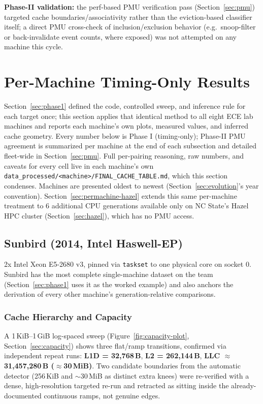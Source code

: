 \documentclass{article}
\begin{document}
\textbf{Phase-II validation:} the perf-based PMU verification pass (Section~\ref{sec:pmu})
targeted cache boundaries/associativity rather than the eviction-based classifier itself;
a direct PMU cross-check of inclusion/exclusion behavior (e.g.\ snoop-filter or
back-invalidate event counts, where exposed) was not attempted on any machine this cycle.

\section{Per-Machine Timing-Only Results}
\label{sec:permachine}

Section~\ref{sec:phase1} defined the code, controlled sweep, and inference rule for each
target once; this section applies that identical method to all eight ECE lab machines and
reports each machine's own plots, measured values, and inferred cache geometry. Every
number below is Phase I (timing-only); Phase-II PMU agreement is summarized per machine at
the end of each subsection and detailed fleet-wide in Section~\ref{sec:pmu}. Full
per-pairing reasoning, raw numbers, and caveats for every cell live in each machine's own
\texttt{data\_processed/<machine>/FINAL\_CACHE\_TABLE.md}, which this section condenses.
Machines are presented oldest to newest (Section~\ref{sec:evolution}'s year convention).
Section~\ref{sec:permachine-hazel} extends this same per-machine treatment to 6 additional
CPU generations available only on NC State's Hazel HPC cluster (Section~\ref{sec:hazel}),
which has no PMU access.

\subsection{Sunbird (2014, Intel Haswell-EP)}
\label{sec:machine-sunbird}

2x Intel Xeon E5-2680 v3, pinned via \texttt{taskset} to one physical core on socket 0.
Sunbird has the most complete single-machine dataset on the team (Section~\ref{sec:phase1}
uses it as the worked example) and also anchors the derivation of every other machine's
generation-relative comparisons.

\subsubsection{Cache Hierarchy and Capacity}
A 1\,KiB--1\,GiB log-spaced sweep (Figure~\ref{fig:capacity-plot}, Section~\ref{sec:capacity})
shows three flat/ramp transitions, confirmed via independent repeat runs: \textbf{L1D =
32,768\,B}, \textbf{L2 = 262,144\,B}, \textbf{LLC $\approx$ 31,457,280\,B ($\approx$30\,MiB)}.
Two candidate boundaries from the automatic detector (256\,KiB and $\sim$30\,MiB as
distinct extra knees) were re-verified with a dense, high-resolution targeted re-run and
retracted as sitting inside the already-documented continuous ramps, not genuine edges.
\end{document}

